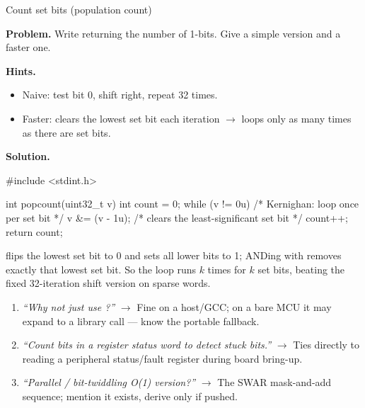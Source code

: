 \begin{gymproblem}{Count set bits (population count)}

\textbf{Problem.} Write  returning the number
of 1-bits. Give a simple version and a faster one.

\textbf{Hints.}
\begin{itemize}
\item Naive: test bit 0, shift right, repeat 32 times.
\item Faster:  clears the lowest set bit each iteration
  $\rightarrow$ loops only as many times as there are set bits.
\end{itemize}

\attempt

\textbf{Solution.}
\begin{cgym}
#include <stdint.h>

int popcount(uint32_t v) {
    int count = 0;
    while (v != 0u) {        /* Kernighan: loop once per set bit     */
        v &= (v - 1u);       /* clears the least-significant set bit */
        count++;
    }
    return count;
}
\end{cgym}

 flips the lowest set bit to 0 and sets all lower bits to 1;
ANDing with  removes exactly that lowest set bit. So the loop runs
$k$ times for $k$ set bits, beating the fixed 32-iteration shift version on
sparse words.

\followups
\begin{enumerate}
\item \emph{``Why not just use ?''} $\rightarrow$
  Fine on a host/GCC; on a bare MCU it may expand to a library call --- know
  the portable fallback.
\item \emph{``Count bits in a register status word to detect stuck bits.''}
  $\rightarrow$ Ties directly to reading a peripheral status/fault register
  during board bring-up.
\item \emph{``Parallel / bit-twiddling O(1) version?''} $\rightarrow$ The
  SWAR mask-and-add sequence; mention it exists, derive only if pushed.
\end{enumerate}
\end{gymproblem}

